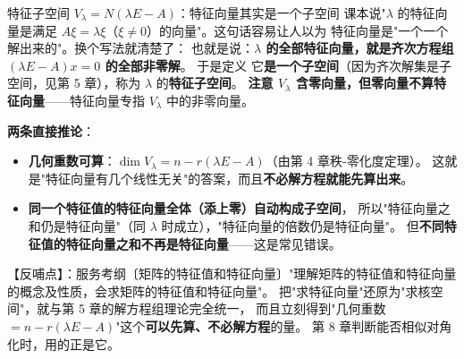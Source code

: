 
\begin{fdeep}{特征子空间 $V_{\lambda}=N(\lambda E-A)$：特征向量其实是一个子空间}
课本说"$\lambda$ 的特征向量是满足 $A\xi=\lambda\xi$（$\xi\ne0$）的向量"。这句话容易让人以为
特征向量是"一个一个解出来的"。换个写法就清楚了：
也就是说：\textbf{$\lambda$ 的全部特征向量，就是齐次方程组 $(\lambda E-A)x=0$ 的全部非零解}。
于是定义
它\textbf{是一个子空间}（因为齐次解集是子空间，见第 5 章），称为 $\lambda$ 的\textbf{特征子空间}。
\textbf{注意 $V_{\lambda}$ 含零向量，但零向量不算特征向量}——特征向量专指 $V_{\lambda}$ 中的非零向量。

\textbf{两条直接推论}：
\begin{itemize}[leftmargin=2.2em,itemsep=0.22em]
\item \textbf{几何重数可算}：$\dim V_{\lambda}=n-r(\lambda E-A)$（由第 4 章秩-零化度定理）。
      这就是"特征向量有几个线性无关"的答案，而且\textbf{不必解方程就能先算出来}。
\item \textbf{同一个特征值的特征向量全体（添上零）自动构成子空间}，
      所以"特征向量之和仍是特征向量"（同 $\lambda$ 时成立），"特征向量的倍数仍是特征向量"。
      但\textbf{不同特征值的特征向量之和不再是特征向量}——这是常见错误。
\end{itemize}
【反哺点】：服务考纲〔矩阵的特征值和特征向量〕"理解矩阵的特征值和特征向量的概念及性质，会求矩阵的特征值和特征向量"。
把"求特征向量"还原为"求核空间"，就与第 5 章的解方程组理论完全统一，
而且立刻得到"几何重数 $=n-r(\lambda E-A)$"这个\textbf{可以先算、不必解方程}的量。
第 8 章判断能否相似对角化时，用的正是它。
\end{fdeep}

